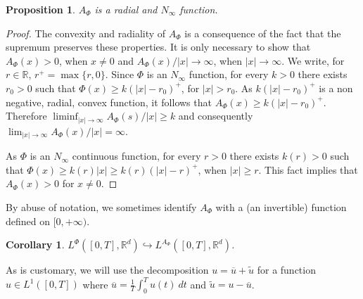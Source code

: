 \documentclass[twoside]{article}
\newtheorem{cor}[thm]{Corollary}
\newtheorem{prop}[thm]{Proposition}
\theoremstyle{remark}
\newcounter{example}[section]
\newcommand{\lphi}{L^{\Phi}}
\newcommand{\rr}{\mathbb{R}}
\renewcommand{\leq}{\leqslant}
\renewcommand{\geq}{\geqslant}
\begin{document}
\begin{prop}\label{prop:AsubPhi}  $A_{\Phi}$ is a radial and $N_{\infty}$ function.
\end{prop}

\begin{proof} The convexity and radiality of $A_{\Phi}$ is a consequence of the fact that the supremum preserves these properties. It is only necessary to show that $A_{\Phi}(x)>0$, when $x\neq 0$ and  $A_{\Phi}(x)/|x|\to\infty$, when $|x|\to\infty$. We write, for $r\in\rr$, $r^+=\max\{r,0\}$. Since $\Phi$ is an $N_{\infty}$ function,  for every $k>0$ there exists $r_0>0$ such that  $\Phi(x)\geq k(|x|-r_0)^+$, for $|x|>r_0$.  As $ k(|x|-r_0)^+$ is a non negative, radial, convex function, it follows that $A_{\Phi}(x)\geq k(|x|-r_0)^+$. Therefore $\liminf_{|x|\to\infty} A_{\Phi}(s)/|x|\geq k$ and consequently   $\lim_{|x|\to\infty} A_{\Phi}(x)/|x|=\infty$.

As $\Phi$ is an
$N_{\infty}$ continuous function, for every $r>0$ there exists $k(r)>0$ such that $\Phi(x)\geq k(r)|x|\geq k(r)(|x|-r)^+$, when $|x|\geq r$. This fact implies that $A_{\Phi}(x)>0$ for $x\neq 0$.
\end{proof}
By abuse of notation, we sometimes identify $A_{\Phi}$ with a (an invertible) function defined on $[0,+\infty)$. 
\begin{cor}\label{cor:incr_aphi} $\lphi([0,T],\rr^d) \hookrightarrow L^{A_{\Phi}}([0,T],\rr^d)$.

\end{cor}
% 
% 
% 
% 
% 
% 



 As is customary, we will use the decomposition $u=\overline{u}+\widetilde{u}$ for a function $u\in L^1([0,T])$  where $\overline{u} =\frac1T\int_0^T u(t)\ dt$ and $\widetilde{u}=u-\overline{u}$.
\end{document}
